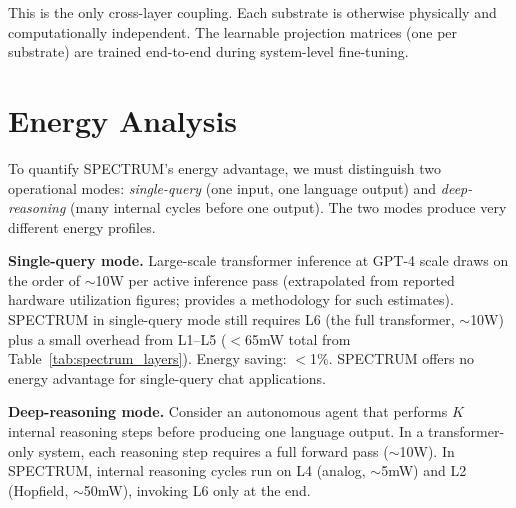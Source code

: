 \documentclass[12pt]{article}
\begin{document}
This is the only cross-layer coupling. Each substrate is otherwise physically and computationally independent. The learnable projection matrices (one per substrate) are trained end-to-end during system-level fine-tuning.

\section{Energy Analysis}
\label{sec:energy}

To quantify SPECTRUM's energy advantage, we must distinguish two operational modes: \emph{single-query} (one input, one language output) and \emph{deep-reasoning} (many internal cycles before one output). The two modes produce very different energy profiles.

\textbf{Single-query mode.} Large-scale transformer inference at GPT-4 scale draws on the order of $\sim$10W per active inference pass (extrapolated from reported hardware utilization figures; \cite{lottick2019} provides a methodology for such estimates). SPECTRUM in single-query mode still requires L6 (the full transformer, $\sim$10W) plus a small overhead from L1--L5 ($<$65mW total from Table~\ref{tab:spectrum_layers}). Energy saving: $<$1\%. SPECTRUM offers no energy advantage for single-query chat applications.

\textbf{Deep-reasoning mode.} Consider an autonomous agent that performs $K$ internal reasoning steps before producing one language output. In a transformer-only system, each reasoning step requires a full forward pass ($\sim$10W). In SPECTRUM, internal reasoning cycles run on L4 (analog, $\sim$5mW) and L2 (Hopfield, $\sim$50mW), invoking L6 only at the end.
\end{document}

